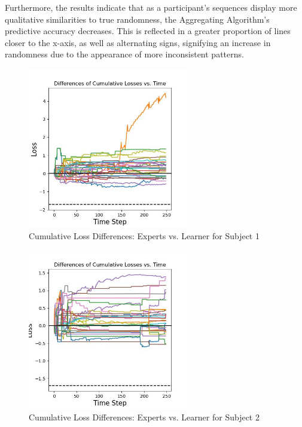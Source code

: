Furthermore, the results indicate that as a participant's sequences display more qualitative similarities to true randomness, the Aggregating Algorithm's predictive accuracy decreases. This is reflected in a greater proportion of lines closer to the x-axis, as well as alternating signs, signifying an increase in randomness due to the appearance of more inconsistent patterns.

\begin{figure}[hb]
    \centering
    \includegraphics[width=0.625\textwidth]{images/AH_differences.jpg}
    \caption{Cumulative Loss Differences: Experts vs. Learner for Subject 1}
\end{figure}
\begin{figure}[ht]
    \centering
    \includegraphics[width=0.625\textwidth]{images/EE_differences.jpg}
    \caption{Cumulative Loss Differences: Experts vs. Learner for Subject 2}
\end{figure}
